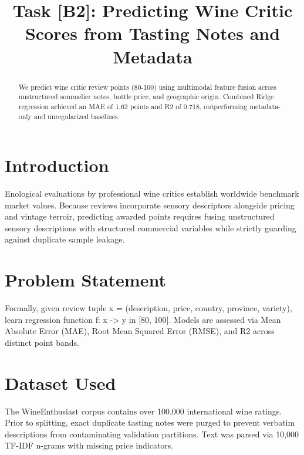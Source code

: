 \documentclass[conference]{IEEEtran}
\begin{document}
\title{Task [B2]: Predicting Wine Critic Scores from Tasting Notes and Metadata}

\author{
}

\maketitle

\begin{abstract}
We predict wine critic review points (80-100) using multimodal feature fusion across unstructured sommelier notes, bottle price, and geographic origin. Combined Ridge regression achieved an MAE of 1.62 points and R2 of 0.718, outperforming metadata-only and unregularized baselines.
\end{abstract}

\section{Introduction}
Enological evaluations by professional wine critics establish worldwide benchmark market values. Because reviews incorporate sensory descriptors alongside pricing and vintage terroir, predicting awarded points requires fusing unstructured sensory descriptions with structured commercial variables while strictly guarding against duplicate sample leakage.

\section{Problem Statement}
Formally, given review tuple x = (description, price, country, province, variety), learn regression function f: x -> y in [80, 100]. Models are assessed via Mean Absolute Error (MAE), Root Mean Squared Error (RMSE), and R2 across distinct point bands.

\section{Dataset Used}
The WineEnthusiast corpus contains over 100,000 international wine ratings. Prior to splitting, exact duplicate tasting notes were purged to prevent verbatim descriptions from contaminating validation partitions. Text was parsed via 10,000 TF-IDF n-grams with missing price indicators.
\end{document}
